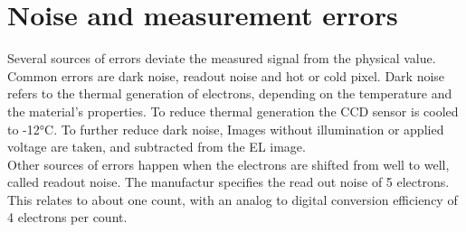 \section{Noise and measurement errors}
Several sources of errors deviate the measured signal from the physical value. Common errors are dark noise, readout noise and hot or cold pixel. Dark noise refers to the thermal generation of electrons, depending on the temperature and the material's properties. To reduce thermal generation the CCD sensor is cooled to -12°C. To further reduce dark noise, Images without illumination or applied voltage are taken, and subtracted from the EL image.\\

Other sources of errors happen when the electrons are shifted from well to well, called readout noise. The manufactur specifies the read out noise of 5 electrons. This relates to about one count, with an analog to digital conversion efficiency of 4 electrons per count.\cite{ManualSensicam}
 